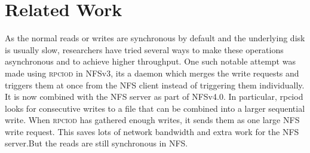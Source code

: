 \section{Related Work}
\label{related} 

	As the normal reads or writes are synchronous by default and the underlying disk is usually slow, researchers have tried several ways to make these operations asynchronous and to achieve higher throughput.  One such notable attempt was made using \textsc{rpciod} \cite{NFSv4} in NFSv3, its a daemon which merges the write requests and triggers them at once from the NFS client instead of triggering them individually. It is now combined with the NFS server as part of NFSv4.0. In particular, rpciod looks for consecutive writes to a file that can be combined into a larger sequential write. When \textsc{rpciod} has gathered enough writes, it sends them as one large NFS write request. This saves lots of network bandwidth and extra work for the NFS server.But the reads are still synchronous in NFS.  
	
